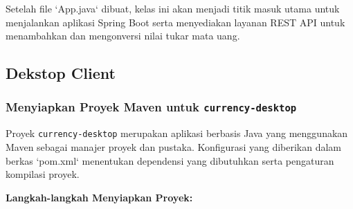 Setelah file `App.java` dibuat, kelas ini akan menjadi titik masuk utama untuk menjalankan aplikasi Spring Boot serta menyediakan layanan REST API untuk menambahkan dan mengonversi nilai tukar mata uang.

\subsection{Dekstop Client}

\subsubsection{Menyiapkan Proyek Maven untuk \texttt{currency-desktop}}
Proyek \texttt{currency-desktop} merupakan aplikasi berbasis Java yang menggunakan Maven sebagai manajer proyek dan pustaka. Konfigurasi yang diberikan dalam berkas `pom.xml` menentukan dependensi yang dibutuhkan serta pengaturan kompilasi proyek.

\textbf{Langkah-langkah Menyiapkan Proyek:}

